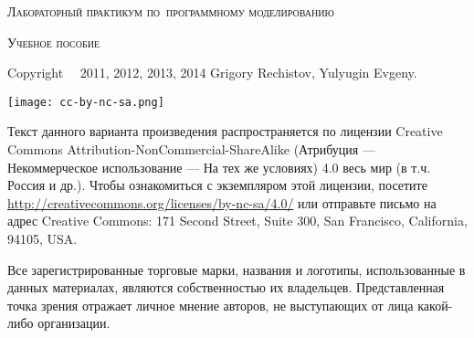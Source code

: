 
\thispagestyle{empty}

\begin{center}
	\huge\textsc{Лабораторный практикум по~программному моделированию}\par
	
	\bigskip
	
	\Large\textsc{Учебное пособие}
\end{center}


\newlength{\centeroffset}
\setlength{\centeroffset}{-0.5\oddsidemargin}
\addtolength{\centeroffset}{0.5\evensidemargin}

\noindent\hspace*{\centeroffset}
\pagebreak

\thispagestyle{empty}
\begin{small} 
Copyright \textcopyright~~2011, 2012, 2013, 2014 Grigory Rechistov, Yulyugin Evgeny.
\begin{center}
	\texttt{[image: cc-by-nc-sa.png]}
\end{center}

Текст данного варианта произведения распространяется по лицензии Creative Commons At\-tri\-bu\-tion-Non\-Com\-mer\-cial-Share\-Alike (Атрибуция — Некоммерческое использование — На тех же условиях) 4.0 весь мир (в т.ч. Россия и др.). Чтобы ознакомиться с экземпляром этой лицензии, посетите \url{http://creativecommons.org/licenses/by-nc-sa/4.0/} или отправьте письмо на адрес Creative Commons: 171 Second Street, Suite 300, San Francisco, California, 94105, USA. 

Все зарегистрированные торговые марки, названия и логотипы, использованные в данных материалах, являются собственностью их владельцев. Представленная точка зрения отражает личное мнение авторов, не выступающих от лица какой-либо организации.
\end{small}
